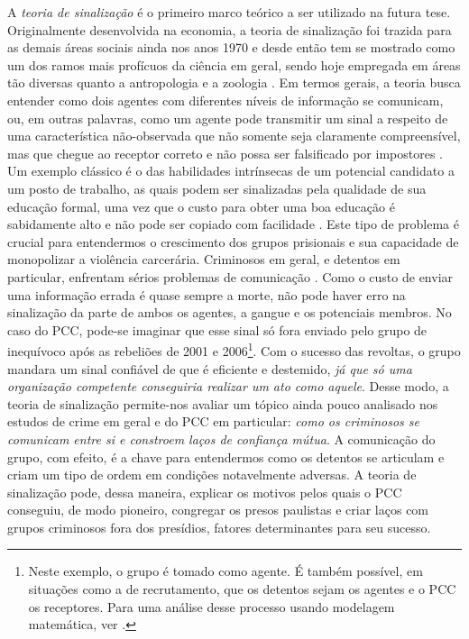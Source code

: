 \documentclass[a4paper,11pt]{article}
\begin{document}
A \textit{teoria de sinalização} é o primeiro marco teórico a ser utilizado na futura tese. Originalmente desenvolvida na economia, a teoria de sinalização foi trazida para as demais áreas sociais ainda nos anos 1970 e desde então tem se mostrado como um dos ramos mais profícuos da ciência em geral, sendo hoje empregada em áreas tão diversas quanto a antropologia e a zoologia \citep{connelly2011signaling, cook2007cooperation}. Em termos gerais, a teoria busca entender como dois agentes com diferentes níveis de informação se comunicam, ou, em outras palavras, como um agente pode transmitir um sinal a respeito de uma característica não-observada que não somente seja claramente compreensível, mas que chegue ao receptor correto e não possa ser falsificado por impostores \citep{gambetta2009signaling}. Um exemplo clássico é o das habilidades intrínsecas de um potencial candidato a um posto de trabalho, as quais podem ser sinalizadas pela qualidade de sua educação formal, uma vez que o custo para obter uma boa educação é sabidamente alto e não pode ser copiado com facilidade \citep{spence1973job}. Este tipo de problema é crucial para entendermos o crescimento dos grupos prisionais e sua capacidade de monopolizar a violência carcerária. Criminosos em geral, e detentos em particular, enfrentam sérios problemas de comunicação \citep{freire2014entering, gambetta2009codes}. Como o custo de enviar uma informação errada é quase sempre a morte, não pode haver erro na sinalização da parte de ambos os agentes, a gangue e os potenciais membros. No caso do PCC, pode-se imaginar que esse sinal só fora enviado pelo grupo de inequívoco após as rebeliões de 2001 e 2006\footnote{Neste exemplo, o grupo é tomado como agente. É também possível, em situações como a de recrutamento, que os detentos sejam os agentes e o PCC os receptores. Para uma análise desse processo usando modelagem matemática, ver \citet{freire2014entering}.}. Com o sucesso das revoltas, o grupo mandara um sinal confiável de que é eficiente e destemido, \textit{já que só uma organização competente conseguiria realizar um ato como aquele}. Desse modo, a teoria de sinalização
permite-nos avaliar um tópico ainda pouco analisado nos estudos de crime em geral e do PCC em particular: \textit{como os criminosos se comunicam entre si e constroem laços de confiança mútua}. A comunicação do grupo, com efeito, é a chave para entendermos como os detentos se articulam e criam um tipo de ordem em condições notavelmente adversas. A teoria de sinalização pode, dessa maneira, explicar os motivos pelos quais o PCC conseguiu, de modo pioneiro, congregar os presos paulistas e criar laços com grupos criminosos fora dos presídios, fatores determinantes para seu sucesso.
\end{document}
